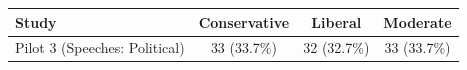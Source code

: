 \begin{table}
\fontsize{12.0pt}{14.4pt}\selectfont
\begin{tabular*}{\linewidth}{@{\extracolsep{\fill}}lccc}
\toprule
Study & Conservative & Liberal & Moderate \\ 
\midrule\addlinespace[2.5pt]
Pilot 3 (Speeches: Political) & 33 (33.7\%) & 32 (32.7\%) & 33 (33.7\%) \\ 
\bottomrule
\end{tabular*}
\end{table}

